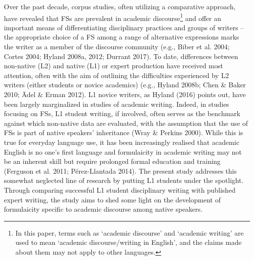 \documentclass[12pt]{article}
\newenvironment{styleStandard}{\setlength\leftskip{0cm}\setlength\rightskip{0cm plus 1fil}\setlength\parindent{0cm}\setlength\parfillskip{0pt plus 1fil}\setlength\parskip{0cm plus 1pt}\writerlistparindent\writerlistleftskip\leavevmode\normalfont\normalsize\writerlistlabel\ignorespaces}{\unskip\vspace{0cm plus 1pt}\par}
\newcommand\writerlistleftskip{}
\newcommand\writerlistparindent{}
\newcommand\writerlistlabel{}
\begin{document}
\begin{styleStandard}
Over the past decade, corpus studies, often utilizing a comparative approach, have revealed that FSs are prevalent in academic discourse\footnote{ In this paper, terms such as ‘academic discourse’ and ‘academic writing’ are used to mean ‘academic discourse/writing in English’, and the claims made about them may not apply to other languages.} and offer an important means of differentiating disciplinary practices and groups of writers – the appropriate choice of a FS among a range of alternative expressions marks the writer as a member of the discourse community (e.g., Biber et al. 2004; Cortes 2004; Hyland 2008a, 2012; Durrant 2017). To date, differences between non-native (L2) and native (L1) or expert production have received most attention, often with the aim of outlining the difficulties experienced by L2 writers (either students or novice academics) (e.g., Hyland 2008b; Chen \& Baker 2010; Ädel \& Erman 2012). L1 novice writers, as Hyland (2016) points out, have been largely marginalized in studies of academic writing. Indeed, in studies focusing on FSs, L1 student writing, if involved, often serves as the benchmark against which non-native data are evaluated, with the assumption that the use of FSs is part of native speakers’ inheritance (Wray \& Perkins 2000). While this is true for everyday language use, it has been increasingly realised that academic English is no one’s first language and formulaicity in academic writing may not be an inherent skill but require prolonged formal education and training (Ferguson et al. 2011; Pérez-Llantada 2014). The present study addresses this somewhat neglected line of research by putting L1 students under the spotlight. Through comparing successful L1 student disciplinary writing with published expert writing, the study aims to shed some light on the development of formulaicity specific to academic discourse among native speakers. 
\end{styleStandard}
\end{document}
